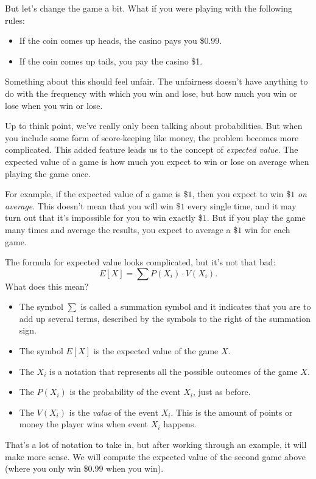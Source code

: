 \documentclass{ximera}
\begin{document}
But let's change the game a bit. What if you were playing with the following rules:
\begin{itemize}
  \item If the coin comes up heads, the casino pays you \$0.99.
  \item If the coin comes up tails, you pay the casino \$1.
\end{itemize}
Something about this should feel unfair. The unfairness doesn't have anything to do with the frequency with which you win and lose, but how much you win or lose when you win or lose.

Up to think point, we've really only been talking about probabilities. But when you include some form of score-keeping like money, the problem becomes more complicated. This added feature leads us to the concept of \emph{expected value}. The expected value of a game is how much you expect to win or lose on average when playing the game once.

For example, if the expected value of a game is \$$1$, then you expect to win \$$1$ \emph{on average}. This doesn't mean that you will win \$$1$ every single time, and it may turn out that it's impossible for you to win exactly \$$1$. But if you play the game many times and average the results, you expect to average a \$$1$ win for each game.

The formula for expected value looks complicated, but it's not that bad:
\[ E[X] = \sum P(X_i) \cdot V(X_i). \]
What does this mean?
\begin{itemize}
  \item The symbol $\sum$ is called a summation symbol and it indicates that you are to add up several terms, described by the symbols to the right of the summation sign.
  \item The symbol $E[X]$ is the expected value of the game $X$.
  \item The $X_i$ is a notation that represents all the possible outcomes of the game $X$.
  \item The $P(X_i)$ is the probability of the event $X_i$, just as before.
  \item The $V(X_i)$ is the \emph{value} of the event $X_i$. This is the amount of points or money the player wins when event $X_i$ happens.
\end{itemize}

That's a lot of notation to take in, but after working through an example, it will make more sense. We will compute the expected value of the second game above (where you only win \$0.99 when you win).
\end{document}
